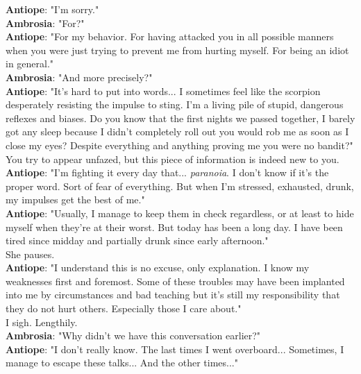 \documentclass{report}
\newcommand{\speaker}[1]{
	\textbf{#1}: 
}
\begin{document}
\speaker{Antiope} "I'm sorry."\\

\speaker{Ambrosia} "For?"\\

\speaker{Antiope} "For my behavior. For having attacked you in all possible manners when you were just trying to prevent me from hurting myself. For being an idiot in general."\\

\speaker{Ambrosia} "And more precisely?"\\

\speaker{Antiope} "It's hard to put into words... I sometimes feel like the scorpion desperately resisting the impulse to sting. I'm a living pile of stupid, dangerous reflexes and biases. Do you know that the first nights we passed together, I barely got any sleep because I didn't completely roll out you would rob me as soon as I close my eyes? Despite everything and anything proving me you were no bandit?"\\

You try to appear unfazed, but this piece of information is indeed new to you.\\

\speaker{Antiope} "I'm fighting it every day that... \emph{paranoia}. I don't know if it's the proper word. Sort of fear of everything. But when I'm stressed, exhausted, drunk, my impulses get the best of me."\\

\speaker{Antiope} "Usually, I manage to keep them in check regardless, or at least to hide myself when they're at their worst. But today has been a long day. I have been tired since midday and partially drunk since early afternoon."\\

She pauses.\\

\speaker{Antiope} "I understand this is no excuse, only explanation. I know my weaknesses first and foremost. Some of these troubles may have been implanted into me by circumstances and bad teaching but it's still my responsibility that they do not hurt others. Especially those I care about."\\

I sigh. Lengthily.\\

\speaker{Ambrosia} "Why didn't we have this conversation earlier?"\\

\speaker{Antiope} "I don't really know. The last times I went overboard... Sometimes, I manage to escape these talks... And the other times..."\\
\end{document}
